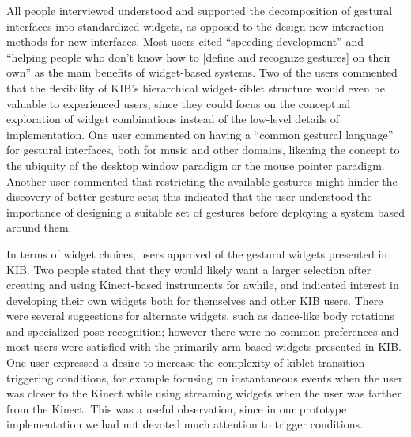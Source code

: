 \documentclass{nime-alternate}
\begin{document}
All people interviewed understood and supported the decomposition of gestural interfaces
into standardized widgets, as opposed to the design new interaction methods for
new interfaces. Most users cited ``speeding development'' and ``helping people who don't know
how to [define and recognize gestures] on their own'' as the main benefits of widget-based systems. 
Two of the users commented that the
flexibility of KIB's hierarchical widget-kiblet structure would even be valuable to experienced users, since
they could focus on the conceptual exploration of widget combinations instead of the low-level details of 
implementation. One user commented on
having a ``common gestural language'' for gestural interfaces, both for music and other domains,
likening the concept to the ubiquity of the desktop window paradigm or the mouse pointer paradigm. Another
user commented that restricting the available gestures might hinder the discovery of better gesture
sets; this indicated that the user understood the importance of designing a suitable set of
gestures before deploying a system based around them.

In terms of widget choices, users approved of the gestural widgets presented in KIB. Two people stated that they would likely want a larger
selection after creating and using Kinect-based instruments for awhile, and indicated interest in developing
their own widgets both for themselves and other KIB users. There were several 
suggestions for alternate widgets, such as dance-like body rotations and specialized pose recognition; however there
were no common preferences and most users were satisfied with the primarily arm-based widgets presented
in KIB. One user expressed a desire to increase the complexity of kiblet transition triggering conditions,
for example focusing on instantaneous events when the user was closer to the Kinect while using streaming
widgets when the user was farther from the Kinect. This was a useful observation, since in our prototype implementation
we had not devoted much attention to trigger conditions.
\end{document}
